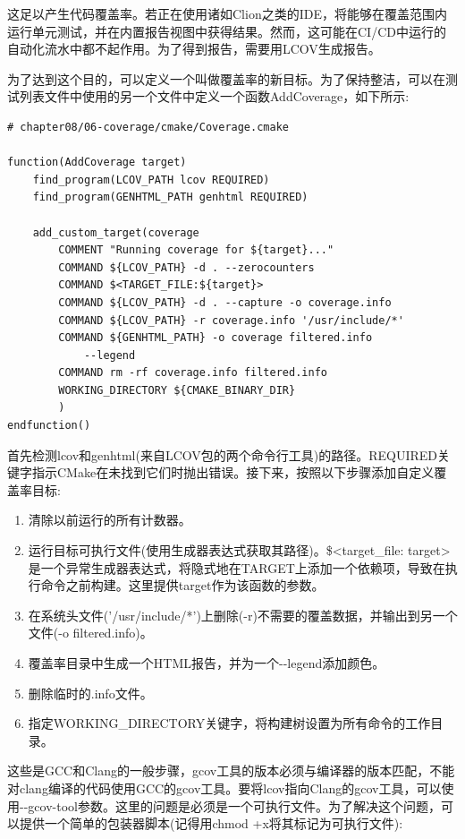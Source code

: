 这足以产生代码覆盖率。若正在使用诸如Clion之类的IDE，将能够在覆盖范围内运行单元测试，并在内置报告视图中获得结果。然而，这可能在CI/CD中运行的自动化流水中都不起作用。为了得到报告，需要用LCOV生成报告。

为了达到这个目的，可以定义一个叫做覆盖率的新目标。为了保持整洁，可以在测试列表文件中使用的另一个文件中定义一个函数AddCoverage，如下所示:

\begin{lstlisting}[style=styleCMake]
# chapter08/06-coverage/cmake/Coverage.cmake

function(AddCoverage target)
	find_program(LCOV_PATH lcov REQUIRED)
	find_program(GENHTML_PATH genhtml REQUIRED)
	
	add_custom_target(coverage
		COMMENT "Running coverage for ${target}..."
		COMMAND ${LCOV_PATH} -d . --zerocounters
		COMMAND $<TARGET_FILE:${target}>
		COMMAND ${LCOV_PATH} -d . --capture -o coverage.info
		COMMAND ${LCOV_PATH} -r coverage.info '/usr/include/*'
		COMMAND ${GENHTML_PATH} -o coverage filtered.info
			--legend
		COMMAND rm -rf coverage.info filtered.info
		WORKING_DIRECTORY ${CMAKE_BINARY_DIR}
		)
endfunction()
\end{lstlisting}

首先检测lcov和genhtml(来自LCOV包的两个命令行工具)的路径。REQUIRED关键字指示CMake在未找到它们时抛出错误。接下来，按照以下步骤添加自定义覆盖率目标:

\begin{enumerate}
\item 
清除以前运行的所有计数器。

\item 
运行目标可执行文件(使用生成器表达式获取其路径)。\$<target\_file: target>是一个异常生成器表达式，将隐式地在TARGET上添加一个依赖项，导致在执行命令之前构建。这里提供target作为该函数的参数。

\item 
在系统头文件('/usr/include/*')上删除(-r)不需要的覆盖数据，并输出到另一个文件(-o filtered.info)。

\item 
覆盖率目录中生成一个HTML报告，并为一个-{}-legend添加颜色。

\item 
删除临时的.info文件。

\item 
指定WORKING\_DIRECTORY关键字，将构建树设置为所有命令的工作目录。
\end{enumerate}

这些是GCC和Clang的一般步骤，gcov工具的版本必须与编译器的版本匹配，不能对clang编译的代码使用GCC的gcov工具。要将lcov指向Clang的gcov工具，可以使用-{}-gcov-tool参数。这里的问题是必须是一个可执行文件。为了解决这个问题，可以提供一个简单的包装器脚本(记得用chmod +x将其标记为可执行文件):

